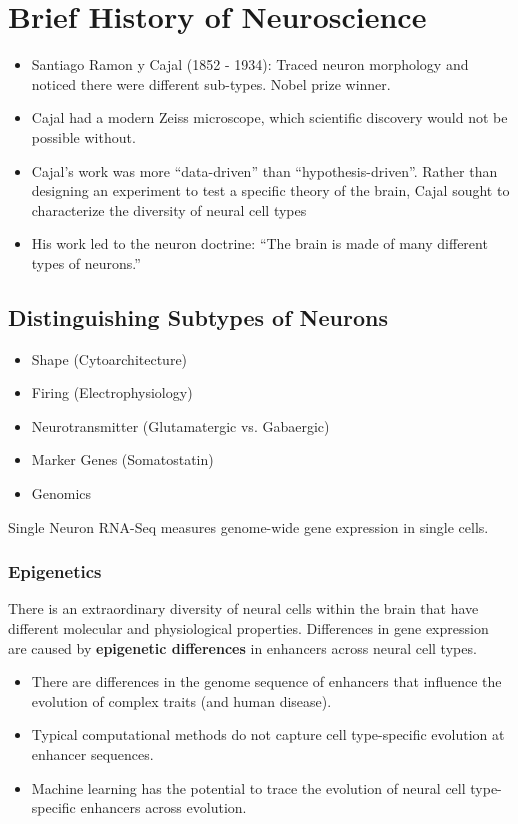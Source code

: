\documentclass[10pt]{article}
\begin{document}
\section*{Brief History of Neuroscience}
\begin{itemize}
	\item Santiago Ramon y Cajal (1852 - 1934): Traced neuron morphology and noticed there were different sub-types.  Nobel prize winner.
	\item Cajal had a modern Zeiss microscope, which scientific discovery would not be possible without.
	\item Cajal's work was more ``data-driven'' than ``hypothesis-driven''.  Rather than designing an experiment to test a specific theory of the brain, Cajal sought to characterize the diversity of neural cell types
	\item His work led to the neuron doctrine: ``The brain is made of many different types of neurons.''
\end{itemize}

\subsection*{Distinguishing Subtypes of Neurons}
\begin{itemize}
	\item Shape (Cytoarchitecture)
	\item Firing (Electrophysiology)
	\item Neurotransmitter (Glutamatergic vs. Gabaergic)
	\item Marker Genes (Somatostatin)
	\item Genomics
\end{itemize}
Single Neuron RNA-Seq measures genome-wide gene expression in single cells.

\subsubsection*{Epigenetics}
There is an extraordinary diversity of neural cells within the brain that have different molecular and physiological properties.  Differences in gene expression are caused by \textbf{epigenetic differences} in enhancers across neural cell types.  
\begin{itemize}
	\item There are differences in the genome sequence of enhancers that influence the evolution of complex traits (and human disease).
	\item Typical computational methods do not capture cell type-specific evolution at enhancer sequences.
	\item Machine learning has the potential to trace the evolution of neural cell type-specific enhancers across evolution.
\end{itemize}
\end{document}
